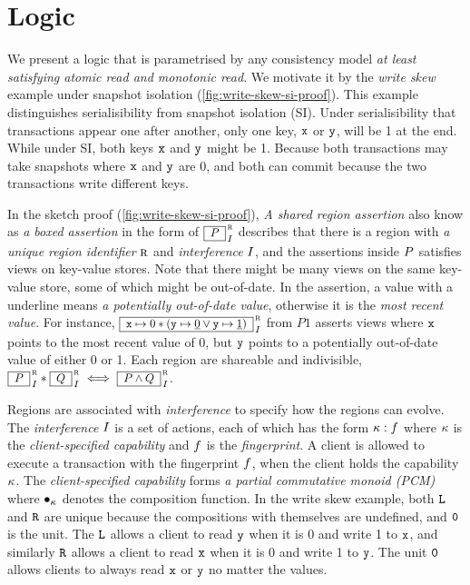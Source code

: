 \section{Logic}


We present a logic that is parametrised by any consistency model \emph{at least satisfying atomic  read and monotonic read}.
We motivate it by the \emph{write skew} example under snapshot isolation (\cref{fig:write-skew-si-proof}).
This example distinguishes serialisibility from snapshot isolation (SI).
Under serialisibility that transactions appear one after another, only one key, \( \texttt{x} \) or \( \texttt{y} \), will be 1 at the end.
While under SI, both keys \( \texttt{x} \) and \( \texttt{y} \) might be 1.
Because both transactions may take snapshots where \( \texttt{x} \) and \( \texttt{y} \) are 0, and both can commit because the two transactions write different keys.

In the sketch proof (\cref{fig:write-skew-si-proof}), \emph{A shared region assertion} also know as \emph{a boxed assertion} in the form of \( \boxass{\gpre}{\lrid}{\intass}\) describes that there is a region with \emph{a unique region identifier} \( \lrid \) and \emph{interference} \( I \), and the assertions inside \( P \) satisfies views on key-value stores.
Note that there might be many views on the same key-value store, some of which might be out-of-date.
In the assertion, a value with a underline means \emph{a potentially out-of-date value}, otherwise it is the \emph{most recent value}.
For instance, \( \boxass{\vx \pt 0 \sep ( \vy \pt \underline{0} \lor \vy \pt \underline{1} ) }{\lrid}{\intass}\) from \( P1 \) asserts views where \( \texttt{x} \) points to the most recent value of 0, but \( \texttt{y} \) points to a potentially out-of-date value of either 0 or 1.
Each region are shareable and indivisible, \ie \( \boxass{\gpre}{\lrid}{\intass} \sep \boxass{\gpost}{\lrid}{\intass} \iff \boxass{\gpre \land \gpost}{\lrid}{\intass}\).

Regions are associated with \emph{interference} to specify how the regions can evolve.
The \emph{interference} \( I \) is a set of actions, each of which has the form \( \kappa : f \) where \( \kappa \) is the \emph{client-specified capability} and \( f \) is the \emph{fingerprint}.
A client is allowed to execute a transaction with the fingerprint \( f \), when the client holds the capability \( \kappa \).
The \emph{client-specified capability} forms \emph{a partial commutative monoid (PCM)} where \( \bullet_{\kappa} \) denotes the composition function.
In the write skew example, both \( \texttt{L} \) and \( \texttt{R} \) are unique because the compositions with themselves are undefined, and \( \texttt{0} \) is the unit.
The \( \texttt{L}\) allows a client to read \( \texttt{y} \) when it is 0 and write 1 to \( \texttt{x} \), and similarly \( \texttt{R} \) allows a client to read \( \texttt{x} \) when it is 0 and write 1 to \( \texttt{y} \).
The unit \( \texttt{0} \) allows clients to always read \( \texttt{x} \) or \( \texttt{y} \) no matter the values.

